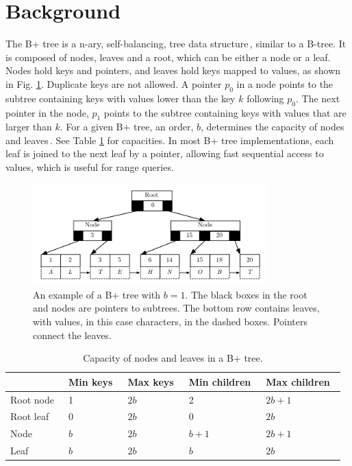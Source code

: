 \section{Background}
\label{sec:Background}
\label{subsec:Background_Bplus_tree}
The B+ tree is a n-ary, self-balancing, tree data structure\,\cite[pp. 334]{ramakrishnan2003database}, similar to a B-tree. It is composed of nodes, leaves and a root, which can be either a node or a leaf. Nodes hold keys and pointers, and leaves hold keys mapped to values, as shown in Fig. \ref{fig:bplustree}. Duplicate keys are not allowed. A pointer $p_0$ in a node points to the subtree containing keys with values lower than the key $k$ following $p_0$. The next pointer in the node, $p_1$ points to the subtree containing keys with values that are larger than $k$. For a given B+ tree, an order, $b$, determines the capacity of nodes and leaves\,\cite[p. 335]{ramakrishnan2003database}. See Table \ref{tab:bpluschildren} for capacities. In most B+ tree implementations, each leaf is joined to the next leaf by a pointer, allowing fast sequential access to values, which is useful for range queries.


\begin{figure}
 \centering
   \includegraphics[width=90mm]{diagrams/BPlusTree.pdf}
 \caption{An example of a B+ tree with $b=1$. The black boxes in the root and nodes are pointers to subtrees. The bottom row contains leaves, with values, in this case characters, in the dashed boxes. Pointers connect the leaves.}
 \label{fig:bplustree}
\end{figure}

\begin{table}
\centering
\label{tab:bpluschildren}
\begin{tabular}{| l | l | l | l | l | }
\hline
           & Min keys~ & Max keys~ & Min children~ & Max children~ \\ \hline
Root node~ &  1  & $2b$ &  2    & $2b+1$ \\ \hline
Root leaf  &  0  & $2b$ &  0    & $2b$   \\ \hline
Node       & $b$ & $2b$ & $b+1$ & $2b+1$ \\ \hline
Leaf       & $b$ & $2b$ & $b$   & $2b$   \\ \hline
\end{tabular}
\caption{Capacity of nodes and leaves in a B+ tree.}
\end{table}

